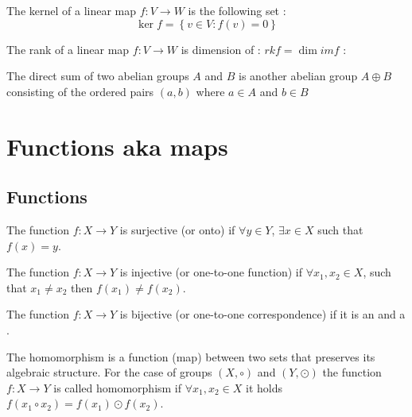 \begin{appendices}
\begin{definition}[Kernel]
  The kernel of a linear map $f: V \to W$ is the following
  set \cite{wiki:kernel}:
  \[
  \ker f = \left\{
  v \in V: f(v) = 0
  \right\}
  \]
  \label{def:kernel}
\end{definition}


\begin{definition}[Rank]
  The rank of a linear map $f: V \to W$ is dimension of
  : $rk f = \dim im f$ \cite{wiki:rank}:
  \label{def:rank}
\end{definition}

\begin{definition}
  The direct sum of two abelian groups $A$ and
  $B$ is another abelian group $A \oplus B$ consisting of the ordered
  pairs
  $\left(a, b\right)$ where $a \in A$ and $b \in B$ \cite{wiki:directsum}
  \label{def:directsum}
\end{definition}

\section{Functions aka maps}

\subsection{Functions}

\begin{definition}[Surjection]
  The function $f: X \rightarrow Y$ is surjective (or onto) if
  $\forall y \in Y$, $\exists x \in X$ such that
  $f\left(x\right) = y$.
  \label{def:surjection}
\end{definition}

\begin{definition}[Injection]
  The function $f: X \rightarrow Y$ is injective (or one-to-one function) if
  $\forall x_1, x_2 \in X$, such that $x_1 \ne x_2$ then
  $f\left(x_1\right) \ne f\left(x_2\right)$.
  \label{def:injection}
\end{definition}

\begin{definition}[Bijection]
  The function $f: X \rightarrow Y$ is bijective (or one-to-one
  correspondence) if it is an  and a
  . 
  \label{def:bijection}
\end{definition}

\begin{definition}[Homomorphism]
  The homomorphism is a function (map) between two sets that preserves
  its algebraic structure. For the case of groups
  $\left(X, \circ\right)$ and $\left(Y, \odot\right)$ the function
  $f: X \rightarrow Y$ is called homomorphism if
  $\forall x_1, x_2 \in X$ it holds
  $f\left(x_1 \circ x_2\right) = f\left(x_1 \right) \odot f\left( x_2\right)$.
  \label{def:homomorphism}
\end{definition}


\end{appendices}
